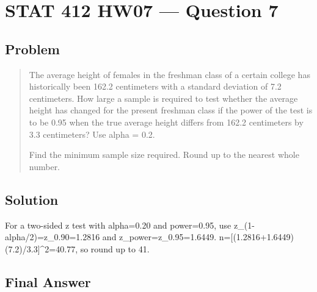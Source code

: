 \documentclass[11pt]{article}
\begin{document}
\section*{STAT 412 HW07 --- Question 7}

\subsection*{Problem}

\begin{quote}
The average height of females in the freshman class of a certain college has historically been 162.2 centimeters with a standard deviation of 7.2 centimeters. How large a sample is required to test whether the average height has changed for the present freshman class if the power of the test is to be 0.95 when the true average height differs from 162.2 centimeters by 3.3 centimeters? Use alpha = 0.2.

Find the minimum sample size required. Round up to the nearest whole number.
\end{quote}

\subsection*{Solution}

For a two-sided z test with alpha=0.20 and power=0.95, use z\_(1-alpha/2)=z\_0.90=1.2816 and z\_power=z\_0.95=1.6449. n=[(1.2816+1.6449)(7.2)/3.3]\textasciicircum{}2=40.77, so round up to 41.

\subsection*{Final Answer}

\end{document}
